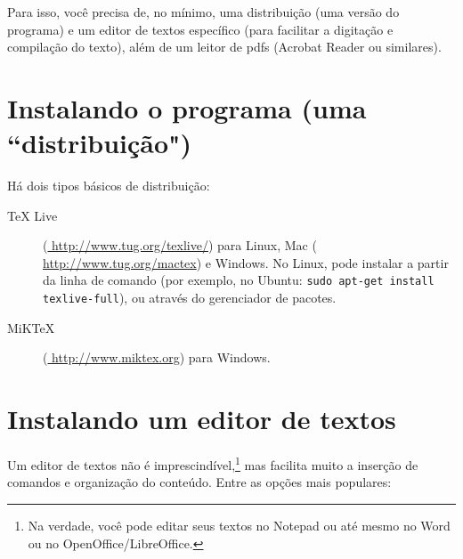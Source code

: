 \documentclass[a4paper,nols,bidi,nohyper,nobib]{tufte-book}
\begin{document}
Para isso, você precisa de, no mínimo, uma distribuição (uma versão do programa) e um editor de textos específico  (para facilitar a digitação e compilação do texto), além de um leitor de pdfs (Acrobat Reader ou similares).



\section{Instalando o programa (uma ``distribuição")}
\label{distribuicoes}
Há dois tipos básicos de distribuição:
\begin{description}
\item [TeX Live] (\url{ http://www.tug.org/texlive/}) para Linux, Mac  (\url{ http://www.tug.org/mactex}) e Windows. No Linux, pode instalar a partir da linha de comando (por exemplo, no Ubuntu: \texttt{sudo apt-get install texlive-full}), ou através do gerenciador de pacotes. 
\item[MiKTeX]  (\url{ http://www.miktex.org}) para Windows.

\end{description}

\section{Instalando um editor de textos}
\label{editor-de-textos}
Um editor de textos não é imprescindível,\footnote{Na verdade, você pode editar seus textos no Notepad ou até mesmo no Word ou no OpenOffice/LibreOffice.} mas facilita muito a inserção de comandos e organização do conteúdo. Entre as opções mais populares:
\end{document}
